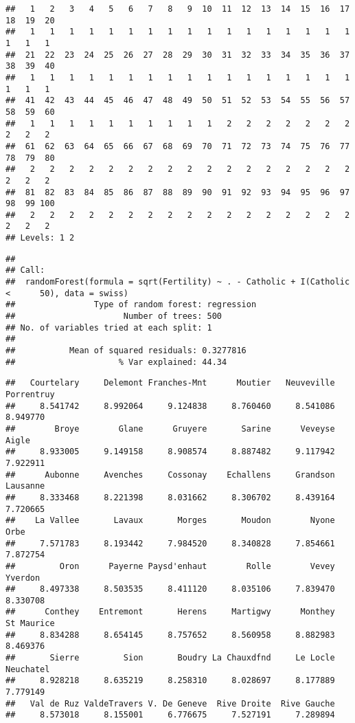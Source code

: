 \documentclass[
]{article}
\begin{document}
\begin{verbatim}
##   1   2   3   4   5   6   7   8   9  10  11  12  13  14  15  16  17  18  19  20 
##   1   1   1   1   1   1   1   1   1   1   1   1   1   1   1   1   1   1   1   1 
##  21  22  23  24  25  26  27  28  29  30  31  32  33  34  35  36  37  38  39  40 
##   1   1   1   1   1   1   1   1   1   1   1   1   1   1   1   1   1   1   1   1 
##  41  42  43  44  45  46  47  48  49  50  51  52  53  54  55  56  57  58  59  60 
##   1   1   1   1   1   1   1   1   1   1   2   2   2   2   2   2   2   2   2   2 
##  61  62  63  64  65  66  67  68  69  70  71  72  73  74  75  76  77  78  79  80 
##   2   2   2   2   2   2   2   2   2   2   2   2   2   2   2   2   2   2   2   2 
##  81  82  83  84  85  86  87  88  89  90  91  92  93  94  95  96  97  98  99 100 
##   2   2   2   2   2   2   2   2   2   2   2   2   2   2   2   2   2   2   2   2 
## Levels: 1 2
\end{verbatim}

\begin{verbatim}
## 
## Call:
##  randomForest(formula = sqrt(Fertility) ~ . - Catholic + I(Catholic <      50), data = swiss) 
##                Type of random forest: regression
##                      Number of trees: 500
## No. of variables tried at each split: 1
## 
##           Mean of squared residuals: 0.3277816
##                     % Var explained: 44.34
\end{verbatim}

\begin{verbatim}
##   Courtelary     Delemont Franches-Mnt      Moutier   Neuveville   Porrentruy 
##     8.541742     8.992064     9.124838     8.760460     8.541086     8.949770 
##        Broye        Glane      Gruyere       Sarine      Veveyse        Aigle 
##     8.933005     9.149158     8.908574     8.887482     9.117942     7.922911 
##      Aubonne     Avenches     Cossonay    Echallens     Grandson     Lausanne 
##     8.333468     8.221398     8.031662     8.306702     8.439164     7.720665 
##    La Vallee       Lavaux       Morges       Moudon        Nyone         Orbe 
##     7.571783     8.193442     7.984520     8.340828     7.854661     7.872754 
##         Oron      Payerne Paysd'enhaut        Rolle        Vevey      Yverdon 
##     8.497338     8.503535     8.411120     8.035106     7.839470     8.330708 
##      Conthey    Entremont       Herens     Martigwy      Monthey   St Maurice 
##     8.834288     8.654145     8.757652     8.560958     8.882983     8.469376 
##       Sierre         Sion       Boudry La Chauxdfnd     Le Locle    Neuchatel 
##     8.928218     8.635219     8.258310     8.028697     8.177889     7.779149 
##   Val de Ruz ValdeTravers V. De Geneve  Rive Droite  Rive Gauche 
##     8.573018     8.155001     6.776675     7.527191     7.289894
\end{verbatim}
\end{document}
